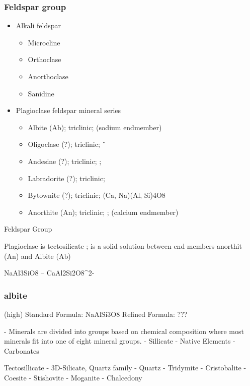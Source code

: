 \subsubsection{Feldspar group}

\begin{itemize}
    \item Alkali feldspar
        \begin{itemize}
            \item Microcline
            \item Orthoclase
            \item Anorthoclase
            \item Sanidine
        \end{itemize}
    \item Plagioclase feldspar mineral series
        \begin{itemize}
            \item Albite (Ab); triclinic;  (sodium endmember)
            \item Oligoclase (?); triclinic;  ¨
            \item Andesine (?); triclinic; ; 
            \item Labradorite (?); triclinic; 
            \item Bytownite (?); triclinic;  (Ca, Na)(Al, Si)4O8
            \item Anorthite (An); triclinic; ; (calcium endmember)
        \end{itemize}        
\end{itemize}


Feldspar Group

Plagioclase is tectosilicate ; is a solid solution between end members anorthit (An) and Albite (Ab) 

NaAl3SiO8 -- CaAl2Si2O8^{2-}


\subsubsection{albite} (high)
Standard Formula: NaAlSi3O8
Refined Formula: ???


- Minerals are divided into groups based on chemical composition where most minerals fit into one of eight mineral groups.
 - Sillicate
 - Native Elements
 - Carbonates
  

Tectosillicate
- 3D-Silicate, Quartz family
  - Quartz 
  - Tridymite
  - Cristobalite
  - Coesite
  - Stishovite
  - Moganite
  - Chalcedony
    
